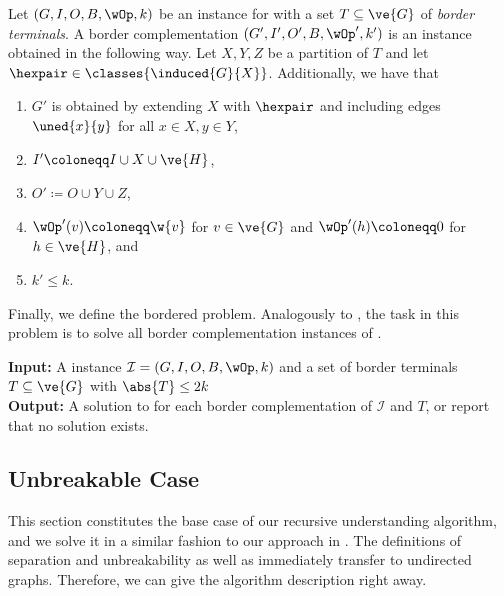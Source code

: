 \begin{lemma}
\begin{lemma}
\begin{lemma}
\begin{lemma}
\begin{lemma}
\begin{definition}\label{def:d_edge_border_complementation}
  Let $(G,I,O,B,\wOp,k)$ be an instance for \probrec{} with a set $T \subseteq \ve{G}$ of \emph{border terminals}. A border complementation $(G',I',O',B,\wOp',k')$ is an instance obtained in the following way. Let $X,Y,Z$ be a partition of $T$ and let $\hexpair \in \classes{\induced{G}{X}}$. Additionally, we have that
  \begin{enumerate}
    \item $G'$ is obtained by extending $X$ with $\hexpair$ and including edges $\uned{x}{y}$ for all $x \in X, y \in Y$,
    \item $I' \coloneqq I \cup X \cup \ve{H}$,
    \item $O' \coloneqq O \cup Y \cup Z$,
    \item $\wOp'(v) \coloneqq \w{v}$ for $v \in \ve{G}$ and $\wOp'(h) \coloneqq 0$ for $h \in \ve{H}$, and
    \item $k' \le k$.\qedhere
  \end{enumerate}
\end{definition}

Finally, we define the bordered problem. Analogously to , the task in this problem is to solve all border complementation instances of \probrec{}.

\begin{tcolorbox}[enhanced,title={\color{black} {\probborder{}}}, colback=white, boxrule=0.4pt,
	attach boxed title to top left={xshift=.3cm, yshift*=-2.5mm},
	boxed title style={size=small,frame hidden,colback=white}]
	
	\textbf{Input:}  
  A \probrec{} instance $\mathcal{I} = (G,I,O,B,\wOp,k)$ and a set of border terminals $T \subseteq \ve{G}$ with $\abs{T} \le 2k$\\

	\textbf{Output:}
  A solution to \probrec{} for each border complementation of $\mathcal{I}$ and $T$, or report that no solution exists.
\end{tcolorbox}

\subsection{Unbreakable Case}\label{sec:d_edge_unbreak}

This section constitutes the base case of our recursive understanding algorithm, and we solve it in a similar fashion to our approach in . The definitions of separation and unbreakability as well as  immediately transfer to undirected graphs. Therefore, we can give the algorithm description right away.


\end{lemma}
\end{lemma}
\end{lemma}
\end{lemma}
\end{lemma}
